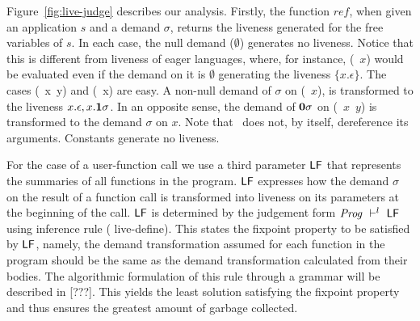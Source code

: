 \documentclass[10pt]{sigplanconf}
\begin{document}
Figure~\ref{fig:live-judge}  describes  our  analysis.   Firstly,  the
function $\mathit{ref}$,  when given an  application $s$ and  a demand
$\sigma$,  returns the liveness  generated for  the free  variables of
$s$.   In  each  case,  the  null demand  ($\emptyset$)  generates  no
liveness.   Notice  that this  is  different  from  liveness of  eager
languages, where, for instance,  (\CDR~$x$) would be evaluated even if
the   demand   on   it   is  $\emptyset$   generating   the   liveness
$\{x.\epsilon\}$.  The  cases (\PRIM~x~y)  and (\NULLQ~x) are  easy. A
non-null  demand of  $\sigma$  on (\CDR~$x$),  is  transformed to  the
liveness  $x.\epsilon,  x.\mathbf{1}\sigma$.   In  an opposite  sense,  the
demand  of  $\mathbf{0}\sigma$ on  (\CONS~$x$~$y$)  is  transformed to  the
demand  $\sigma$  on $x$.   Note  that  \CONS\  does not,  by  itself,
dereference its arguments. Constants generate no liveness.


For  the  case  of a  user-function  call  we  use a  third  parameter
$\mathsf{LF}$  that  represents the  summaries  of  all  functions in  the
program. $\mathsf{LF}$ expresses how the  demand $\sigma$ on the result of
a function call is transformed  into liveness on its parameters at the
beginning of the call.  $\mathsf{LF}$  is determined by the judgement form
$\mathit{Prog}    \ \vdash^l\    \mathsf{LF}$    using   inference    rule   ({\sc
  live-define}). This states the  fixpoint property to be satisfied by
$\mathsf{LF}$, namely, the demand transformation assumed for each function
in  the  program should  be  the  same  as the  demand  transformation
calculated from their bodies. The algorithmic formulation of this rule
through  a  grammar will  be  described  in [???].   This yields  the  least
solution  satisfying  the  fixpoint  property  and  thus  ensures  the
greatest amount of garbage collected.
  


\end{document}
